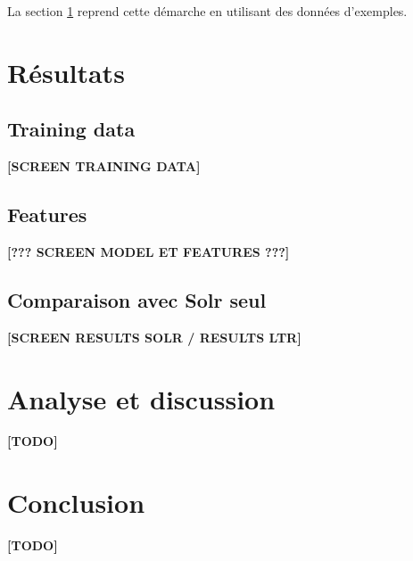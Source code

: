 \documentclass[twocolumn,a4paper]{IEEEtranfr}
\begin{document}
La section \ref{sec:results} reprend cette démarche en utilisant des données d'exemples.


\section{Résultats}\label{sec:results}

\subsection{Training data}
\textbf{[SCREEN TRAINING DATA]}

\subsection{Features}
\textbf{[??? SCREEN MODEL ET FEATURES ???]}

\subsection{Comparaison avec Solr seul}
\textbf{[SCREEN RESULTS SOLR / RESULTS LTR]}



\section{Analyse et discussion}
\textbf{[TODO]}

\section{Conclusion}
\textbf{[TODO]}





\end{document}
